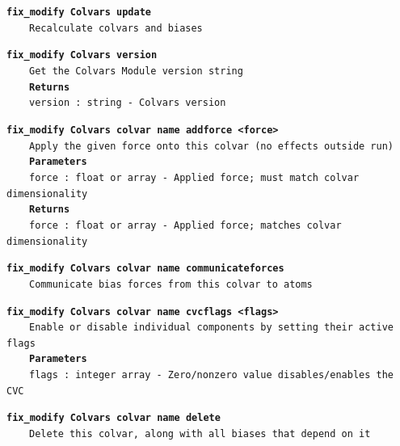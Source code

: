 \begin{mdexampleinput}{}
\texttt{\textbf{fix\_modify Colvars update}}
\\
\-~~~~\texttt{Recalculate colvars and biases}
\end{mdexampleinput}
\begin{mdexampleinput}{}
\texttt{\textbf{fix\_modify Colvars version}}
\\
\-~~~~\texttt{Get the Colvars Module version string}
\\
\-~~~~\texttt{\textbf{Returns}}
\\
\-~~~~\texttt{version : string - Colvars version}
\end{mdexampleinput}
\begin{mdexampleinput}{}
\texttt{\textbf{fix\_modify Colvars colvar name addforce <force>}}
\\
\-~~~~\texttt{Apply the given force onto this colvar (no effects outside run)}
\\
\-~~~~\texttt{\textbf{Parameters}}
\\
\-~~~~\texttt{force : float or array - Applied force; must match colvar dimensionality}
\\
\-~~~~\texttt{\textbf{Returns}}
\\
\-~~~~\texttt{force : float or array - Applied force; matches colvar dimensionality}
\end{mdexampleinput}
\begin{mdexampleinput}{}
\texttt{\textbf{fix\_modify Colvars colvar name communicateforces}}
\\
\-~~~~\texttt{Communicate bias forces from this colvar to atoms}
\end{mdexampleinput}
\begin{mdexampleinput}{}
\texttt{\textbf{fix\_modify Colvars colvar name cvcflags <flags>}}
\\
\-~~~~\texttt{Enable or disable individual components by setting their active flags}
\\
\-~~~~\texttt{\textbf{Parameters}}
\\
\-~~~~\texttt{flags : integer array - Zero/nonzero value disables/enables the CVC}
\end{mdexampleinput}
\begin{mdexampleinput}{}
\texttt{\textbf{fix\_modify Colvars colvar name delete}}
\\
\-~~~~\texttt{Delete this colvar, along with all biases that depend on it}
\end{mdexampleinput}
